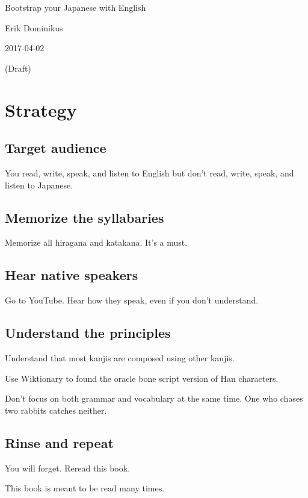 \documentclass[12pt,a4paper,openany]{book}
\begin{document}
\frontmatter
{%
    \setlength\parindent{0em}%
    Bootstrap your Japanese with English\par
    Erik Dominikus\par
    2017-04-02\par
    (Draft)\par
}
\newpage
{}
{}
\tableofcontents
\mainmatter
\chapter{Strategy}

\section{Target audience}

You read, write, speak, and listen to English but don't read, write, speak, and listen to Japanese.

\section{Memorize the syllabaries}

Memorize all hiragana and katakana.
It's a must.

\section{Hear native speakers}

Go to YouTube.
Hear how they speak, even if you don't understand.

\section{Understand the principles}

Understand that most kanjis are composed using other kanjis.

Use Wiktionary to found the oracle bone script version of Han characters.

Don't focus on both grammar and vocabulary at the same time.
One who chases two rabbits catches neither.

\section{Rinse and repeat}

You will forget.
Reread this book.

This book is meant to be read many times.
\end{document}
